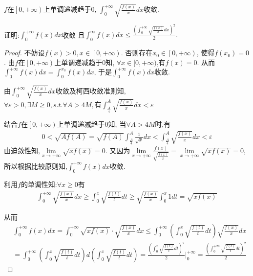 \documentclass[lang=cn,newtx,10pt,scheme=chinese]{elegantbook}
\begin{document}
\begin{example}
$f$在$\left[ 0,+\infty \right) $上单调递减趋于0,
$\int_0^{+\infty}{\sqrt{\frac{f(x)}{x}}dx}$收敛.

证明:$\int_0^{+\infty}{f\left( x \right) dx}$收敛
且$\int_0^{\infty}{f\left( x \right) dx}\leqslant \frac{\left( \int_0^{+\infty}{\sqrt{\frac{f\left( x \right)}{x}}dx} \right) ^2}{2}.$
  \begin{proof}
  不妨设$f(x)>0,x\in \left[ 0,+\infty \right)$.
  否则存在$x_0\in \left[ 0,+\infty \right)$,
  使得$f\left( x_0 \right) =0$.
  由$f$在$\left[ 0,+\infty \right) $上单调递减趋于0知,
 $ \forall x\in [0,+\infty)$,有$f(x)=0$.
 从而$\int_0^{+\infty}{f\left( x \right) dx}=\int_0^{x_0}{f\left( x \right) dx}$,
于是$\int_0^{+\infty}{f\left( x \right) dx}$收敛.

由$\int_0^{+\infty}{\sqrt{\frac{f(x)}{x}}dx}$收敛及柯西收敛准则知,
$\forall \varepsilon>0,\exists M\geqslant 0,s.t. \forall A>4M,\text{有}
\int_{\frac{A}{4}}^A{\sqrt{\frac{f(x)}{x}}dx}<\varepsilon$

结合$f$在$\left[ 0,+\infty \right) $上单调递减趋于0知,
当$\forall A>4M$时,有
\begin{equation}
  \begin{split}
    0<\sqrt{Af(A)}=\sqrt{f(A)}\int_{\frac{A}{4}}^A{\frac{1}{\sqrt{x}}dx<}\int_{\frac{A}{4}}^A{\sqrt{\frac{f(x)}{x}}dx<}\varepsilon 
  \end{split}
\nonumber
\end{equation}
由迫敛性知,$\underset{x\rightarrow +\infty}{\lim}\sqrt{xf(x)}=0$.
又因为$\underset{x\rightarrow +\infty}{\lim}\frac{f(x)}{\sqrt{\frac{f(x)}{x}}}=\underset{x\rightarrow +\infty}{\lim}\sqrt{xf(x)}=0$,
所以根据比较原则知,$\int_0^{+\infty}{f\left( x \right) dx}$收敛.

利用$f$的单调性知:$\forall x \geqslant 0$有
\begin{equation}
  \begin{split}
    \int_0^{+\infty}{\sqrt{\frac{f(x)}{x}}dx}\geqslant \int_0^x{\sqrt{\frac{f(t)}{t}}dt}\geqslant \sqrt{\frac{f(x)}{x}}\int_0^x{1dt}=\sqrt{xf\left( x \right)}
  \end{split}
  \nonumber
\end{equation}

从而
\begin{equation}
  \begin{split}
    &\int_0^{+\infty}{f\left( x \right) dx=}\int_0^{+\infty}{\sqrt{xf\left( x \right)}\cdot \sqrt{\frac{f\left( x \right)}{x}}dx}\leqslant \int_0^{+\infty}{\left( \int_0^x{\sqrt{\frac{f\left( t \right)}{t}}dt} \right) \sqrt{\frac{f\left( x \right)}{x}}dx}
\\
&=\int_0^{+\infty}{\left( \int_0^x{\sqrt{\frac{f\left( t \right)}{t}}dt} \right) d\left( \int_0^x{\sqrt{\frac{f\left( t \right)}{t}}dt} \right)}=\frac{\left( \int_0^x{\sqrt{\frac{f\left( t \right)}{t}}dt} \right) ^2}{2}\Bigg|_{0}^{+\infty}=\frac{\left( \int_0^{+\infty}{\sqrt{\frac{f\left( t \right)}{t}}dt} \right) ^2}{2}
  \end{split}
  \nonumber
\end{equation}
  \end{proof}
\end{example}
\end{document}

